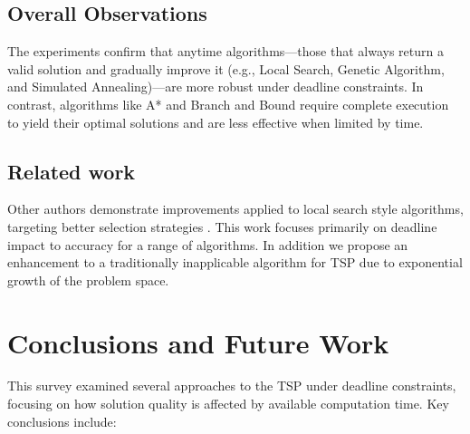 \documentclass[11pt]{article}
\begin{document}
	\subsection{Overall Observations}
	The experiments confirm that anytime algorithms—those that always return a valid solution and gradually improve it (e.g., Local Search, Genetic Algorithm, and Simulated Annealing)—are more robust under deadline constraints. In contrast, algorithms like A* and Branch and Bound require complete execution to yield their optimal solutions and are less effective when limited by time.
	
	\subsection{Related work}
	Other authors demonstrate improvements applied to local search style algorithms, targeting better selection strategies \cite{8367362}\cite{6492788}. This work focuses primarily on deadline impact to accuracy for a range of algorithms. In addition we propose an enhancement to a traditionally inapplicable algorithm for TSP due to exponential growth of the problem space.
	
	\section{Conclusions and Future Work}
	This survey examined several approaches to the TSP under deadline constraints, focusing on how solution quality is affected by available computation time. Key conclusions include:
	
\end{document}
